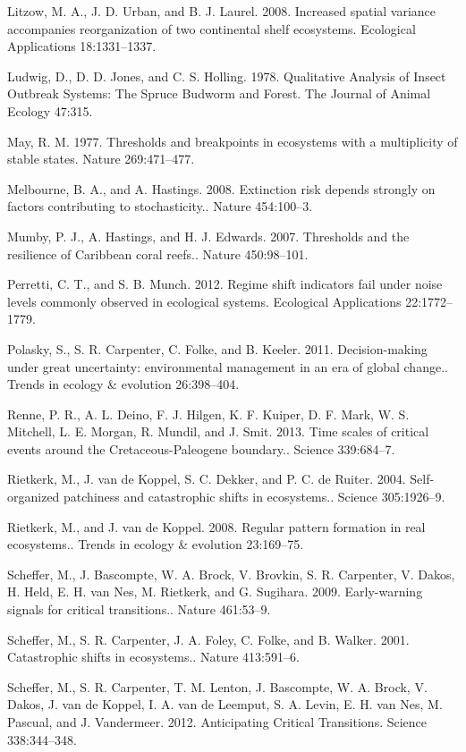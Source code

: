 \documentclass{article}
\begin{document}
Litzow, M. A., J. D. Urban, and B. J. Laurel. 2008. Increased spatial
variance accompanies reorganization of two continental shelf ecosystems.
Ecological Applications 18:1331--1337.

Ludwig, D., D. D. Jones, and C. S. Holling. 1978. Qualitative Analysis
of Insect Outbreak Systems: The Spruce Budworm and Forest. The Journal
of Animal Ecology 47:315.

May, R. M. 1977. Thresholds and breakpoints in ecosystems with a
multiplicity of stable states. Nature 269:471--477.

Melbourne, B. A., and A. Hastings. 2008. Extinction risk depends
strongly on factors contributing to stochasticity.. Nature 454:100--3.

Mumby, P. J., A. Hastings, and H. J. Edwards. 2007. Thresholds and the
resilience of Caribbean coral reefs.. Nature 450:98--101.

Perretti, C. T., and S. B. Munch. 2012. Regime shift indicators fail
under noise levels commonly observed in ecological systems. Ecological
Applications 22:1772--1779.

Polasky, S., S. R. Carpenter, C. Folke, and B. Keeler. 2011.
Decision-making under great uncertainty: environmental management in an
era of global change.. Trends in ecology \& evolution 26:398--404.

Renne, P. R., A. L. Deino, F. J. Hilgen, K. F. Kuiper, D. F. Mark, W. S.
Mitchell, L. E. Morgan, R. Mundil, and J. Smit. 2013. Time scales of
critical events around the Cretaceous-Paleogene boundary.. Science
339:684--7.

Rietkerk, M., J. van de Koppel, S. C. Dekker, and P. C. de Ruiter. 2004.
Self-organized patchiness and catastrophic shifts in ecosystems..
Science 305:1926--9.

Rietkerk, M., and J. van de Koppel. 2008. Regular pattern formation in
real ecosystems.. Trends in ecology \& evolution 23:169--75.

Scheffer, M., J. Bascompte, W. A. Brock, V. Brovkin, S. R. Carpenter, V.
Dakos, H. Held, E. H. van Nes, M. Rietkerk, and G. Sugihara. 2009.
Early-warning signals for critical transitions.. Nature 461:53--9.

Scheffer, M., S. R. Carpenter, J. A. Foley, C. Folke, and B. Walker.
2001. Catastrophic shifts in ecosystems.. Nature 413:591--6.

Scheffer, M., S. R. Carpenter, T. M. Lenton, J. Bascompte, W. A. Brock,
V. Dakos, J. van de Koppel, I. A. van de Leemput, S. A. Levin, E. H. van
Nes, M. Pascual, and J. Vandermeer. 2012. Anticipating Critical
Transitions. Science 338:344--348.
\end{document}
